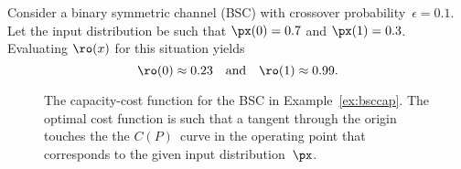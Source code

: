 \begin{example}
  \label{ex:bsccap}
  Consider a binary symmetric channel (BSC) with crossover
  probability~$\epsilon=0.1$. Let the input distribution be such that $\px(0) =
  0.7$ and $\px(1) = 0.3$. Evaluating $\ro(x)$ for this situation yields
  \begin{equation*}
    \ro(0) \approx 0.23 \quad\text{and} \quad
    \ro(1) \approx 0.99.
  \end{equation*}
\end{example}
\medbreak
\begin{figure}[tbph]
  \begin{center}
  \end{center}
  \caption{The capacity-cost function for the BSC in Example~\ref{ex:bsccap}.
  The optimal cost function is such that a tangent through the origin touches
  the the $C(P)$~curve in the operating point that corresponds to the given
  input distribution~$\px$.}
  \label{fig:bsccap}
\end{figure}

